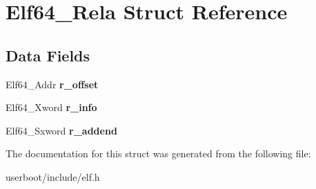 \hypertarget{structElf64__Rela}{}\section{Elf64\+\_\+\+Rela Struct Reference}
\label{structElf64__Rela}
\subsection*{Data Fields}
\begin{DoxyCompactItemize}
\item 
Elf64\+\_\+\+Addr {\bfseries r\+\_\+offset}\hypertarget{structElf64__Rela_a9ea7e07ec6e0d57bf4bcd53b89de7948}{}\label{structElf64__Rela_a9ea7e07ec6e0d57bf4bcd53b89de7948}

\item 
Elf64\+\_\+\+Xword {\bfseries r\+\_\+info}\hypertarget{structElf64__Rela_aeab8bc0f9035184127ec02d947bf2c76}{}\label{structElf64__Rela_aeab8bc0f9035184127ec02d947bf2c76}

\item 
Elf64\+\_\+\+Sxword {\bfseries r\+\_\+addend}\hypertarget{structElf64__Rela_a04358b55027a7dcc414e221d916aac64}{}\label{structElf64__Rela_a04358b55027a7dcc414e221d916aac64}

\end{DoxyCompactItemize}


The documentation for this struct was generated from the following file\+:\begin{DoxyCompactItemize}
\item 
userboot/include/elf.\+h\end{DoxyCompactItemize}
